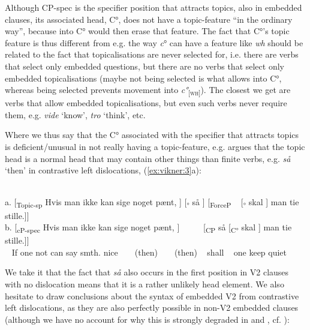 \documentclass[output=paper]{LSP/langsci}
\begin{document}
\noindent Although CP-spec is the specifier position that attracts topics, also in embedded clauses, its associated head, C°, does not have a topic-feature ``in the ordinary way'', because  into C° would then erase that feature. The fact that C°'s topic feature is thus different from e.g. the way \textit{c}° can have a feature like \textit{wh} should be related to the fact that topicalisations are never selected for, i.e. there are verbs that select only embedded questions, but there are no verbs that select only embedded topicalisations (maybe not being selected is what allows  into C°, whereas being selected prevents movement into \textit{c°}\textsubscript{[}\textsc{\textsubscript{wh}}\textsubscript{]}). The closest we get are verbs that allow embedded topicalisations, but even such verbs never require them, e.g. \textit{vide} `know', \textit{tro} `think', etc.

Where we thus say that the C° associated with the specifier that attracts topics is deficient/unusual in not really having a topic-feature, e.g. \citet[146]{Julien2015} argues that the topic head is a normal head that may contain other things than finite verbs, e.g. \textit{så} `then' in contrastive left dislocations, (\ref{ex:vikner:3}a):


\ea%
    \label{ex:vikner:3}
   
\\
 
    \glll a.  [\textsubscript{Topic-sp}   Hvis  man  ikke  kan  sige  noget   pænt,   { ] }  [\textsubscript{°}   så  { ] }   [\textsubscript{ForceP}   ~   [\textsubscript{°}   skal  { ] }  man  tie  stille.]]\\  
	 b.   [{\textsubscript{c}}\textsubscript{P-spec}   Hvis  man  ikke  kan  sige  noget  pænt,  { ] }  ~  ~  ~   [\textsubscript{CP}   så   [\textsubscript{C°}  skal  { ] }  man  tie   stille.]]\\
  ~  {} {If}   one  not  can  say {smth.}  nice  ~  ~  {(then)}  ~  ~   {(then)}   ~  shall  ~  one  keep   {quiet}\\
\z

We take it that the fact that \textit{så} also occurs in the first position in V2 clauses with no dislocation means that it is a rather unlikely head element. We also hesitate to draw conclusions about the syntax of embedded V2 from contrastive left dislocations, as they are also perfectly possible in non-V2 embedded clauses (although we have no account for why this is strongly degraded in  and , cf. \citealt[407]{Johannesen2014}):
\end{document}

